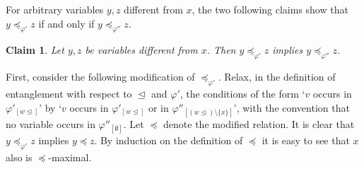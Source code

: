 \documentclass{LMCS}
\newtheorem{clam}{Claim}
\renewcommand{\phi}{\varphi}
\begin{document}
For arbitrary variables $y,z$ different from $x$, 
the two following claims show 
that $y\preceq_{\phi'}z$ if and only if $y\preceq_{\phi''}z$. 

\begin{clam}
Let $y,z$ be variables different from $x$. 
Then $y\preceq_{\phi'}z$ implies $y\preceq_{\phi''}z$. 
\end{clam}

\proof
First, consider the following modification of $\preceq_{\phi'}$. 
Relax, in the definition of entanglement 
with respect to $\trianglelefteq$ and $\phi'$, 
the conditions of the form \lq$v$ occurs in $\phi'_{[w\trianglelefteq]}$\rq{} 
by \lq$v$ occurs in $\phi'_{[w\trianglelefteq]}$ 
or in $\phi''_{[(w\trianglelefteq)\setminus\{x\}]}$\rq, 
with the convention that no variable occurs in $\phi''_{[\emptyset]}$. 
Let $\preceq$ denote the modified relation. 
It is clear that $y\preceq_{\phi'}z$ implies $y\preceq z$. 
By induction on the definition of $\preceq$ 
it is easy to see that $x$ also is $\preceq$-maximal. 
\end{document}
